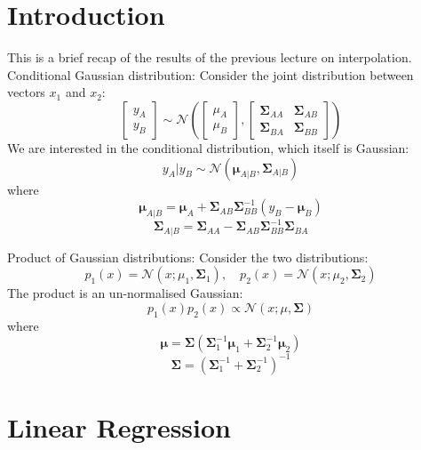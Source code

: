 \documentclass[12pt]{article}
\begin{document}
	\MakeScribeTop


\section{Introduction}

\noindent This is a brief recap of the results of the previous lecture on interpolation.\\

\noindent Conditional Gaussian distribution:
Consider the joint distribution between vectors $x_1$ and $x_2$:
$$
\begin{bmatrix}
y_A \\
y_B
\end{bmatrix} \sim \mathcal{N}\left(
\begin{bmatrix}
\mu_A \\
\mu_B
\end{bmatrix},
\begin{bmatrix}
\boldsymbol{\Sigma}_{AA} & \boldsymbol{\Sigma}_{AB} \\
\boldsymbol{\Sigma}_{BA} & \boldsymbol{\Sigma}_{BB}
\end{bmatrix}
\right)
$$
We are interested in the conditional distribution, which itself is Gaussian:
$$
y_A | y_B \sim \mathcal{N}\left(\boldsymbol{\mu}_{A|B}, \boldsymbol{\Sigma}_{A|B}\right)
$$
where
$$
\boldsymbol{\mu}_{A|B} = \boldsymbol{\mu}_A + \boldsymbol{\Sigma}_{AB} \boldsymbol{\Sigma}_{BB}^{-1} (y_B - \boldsymbol{\mu}_B)
$$
$$
\boldsymbol{\Sigma}_{A|B} = \boldsymbol{\Sigma}_{AA} - \boldsymbol{\Sigma}_{AB} \boldsymbol{\Sigma}_{BB}^{-1} \boldsymbol{\Sigma}_{BA}
$$

\noindent Product of Gaussian distributions:
Consider the two distributions:
$$
p_1(x) = \mathcal{N}(x; \mu_1, \boldsymbol{\Sigma}_1), \quad p_2(x) = \mathcal{N}(x; \mu_2, \boldsymbol{\Sigma}_2)
$$
The product is an un-normalised Gaussian:
$$
p_1(x)p_2(x) \propto \mathcal{N}(x; \mu, \boldsymbol{\Sigma})
$$
where
$$
\boldsymbol{\mu} = \boldsymbol{\Sigma}(\boldsymbol{\Sigma}_1^{-1} \boldsymbol{\mu}_1 + \boldsymbol{\Sigma}_2^{-1} \boldsymbol{\mu}_2)
$$
$$
\boldsymbol{\Sigma} = (\boldsymbol{\Sigma}_1^{-1} + \boldsymbol{\Sigma}_2^{-1})^{-1}
$$
\section{Linear Regression}
\end{document}
